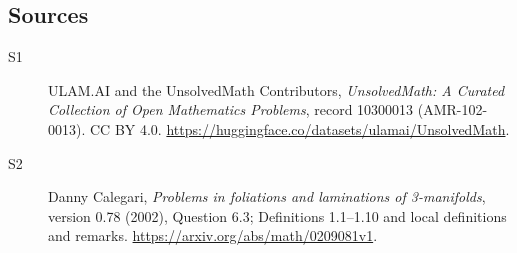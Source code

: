 \documentclass[11pt]{article}
\begin{document}
\subsection{Sources}
\begin{description}
\item[\hypertarget{source:10300013:1}{S1}] ULAM.AI and the UnsolvedMath Contributors, \emph{UnsolvedMath: A Curated Collection of Open Mathematics Problems}, record 10300013 (AMR-102-0013). CC BY 4.0. \url{https://huggingface.co/datasets/ulamai/UnsolvedMath}.
\item[\hypertarget{source:10300013:2}{S2}] Danny Calegari, \emph{Problems in foliations and laminations of 3-manifolds}, version 0.78 (2002), Question 6.3; Definitions 1.1--1.10 and local definitions and remarks. \url{https://arxiv.org/abs/math/0209081v1}.
\end{description}
\label{end:10300013}
\end{document}
